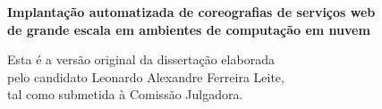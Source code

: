 \documentclass[11pt,twoside,a4paper]{book}
\begin{document}
%
%
%
\newpage
\thispagestyle{empty}
    \begin{center}
        \vspace*{2.3 cm}
        \textbf{\Large{Implantação automatizada de coreografias de serviços web \\
    de grande escala em ambientes de computação em nuvem}}\\
        \vspace*{2 cm}
    \end{center}

    \vskip 2cm

    \begin{flushright}
    Esta é a versão original da dissertação elaborada \\
    pelo candidato Leonardo Alexandre Ferreira Leite, \\
    tal como submetida à Comissão Julgadora. \\
    \end{flushright}

\pagebreak
\end{document}
